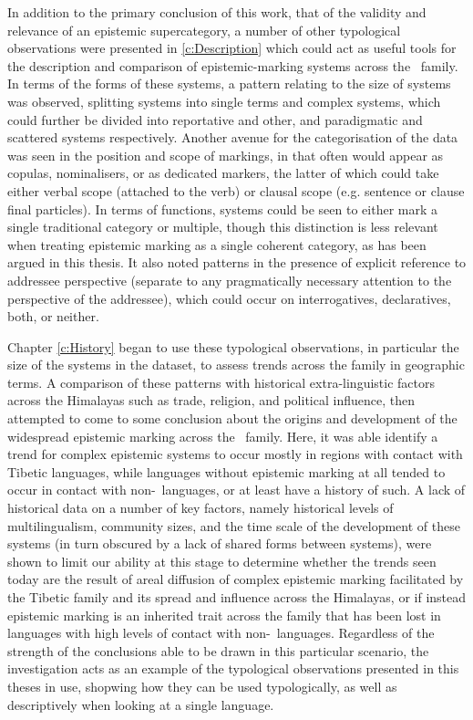 In addition to the primary conclusion of this work, that of the validity and relevance of an epistemic supercategory, a number of other typological observations were presented in \ref{c:Description} which could act as useful tools for the description and comparison of epistemic-marking systems across the \lfam\ family. In terms of the forms of these systems, a pattern relating to the size of systems was observed, splitting systems into single terms and complex systems, which could further be divided into reportative and other, and paradigmatic and scattered systems respectively. Another avenue for the categorisation of the data was seen in the position and scope of markings, in that often would appear as copulas, nominalisers, or as dedicated markers, the latter of which could take either verbal scope (attached to the verb) or clausal scope (e.g. sentence or clause final particles). In terms of functions, systems could be seen to either mark a single traditional category or multiple, though this distinction is less relevant when treating epistemic marking as a single coherent category, as has been argued in this thesis. It also noted patterns in the presence of explicit reference to addressee perspective (separate to any pragmatically necessary attention to the perspective of the addressee), which could occur on interrogatives, declaratives, both, or neither. 

Chapter \ref{c:History} began to use these typological observations, in particular the size of the systems in the dataset, to assess trends across the family in geographic terms. A comparison of these patterns with historical extra-linguistic factors across the Himalayas such as trade, religion, and political influence, then attempted to come to some conclusion about the origins and development of the widespread epistemic marking across the \lfam\ family. Here, it was able identify a trend for complex epistemic systems to occur mostly in regions with contact with Tibetic languages, while languages without epistemic marking at all tended to occur in contact with non-\lfam\ languages, or at least have a history of such. A lack of historical data on a number of key factors, namely historical levels of multilingualism, community sizes, and the time scale of the development of these systems (in turn obscured by a lack of shared forms between systems), were shown to limit our ability at this stage to determine whether the trends seen today are the result of areal diffusion of complex epistemic marking facilitated by the Tibetic family and its spread and influence across the Himalayas, or if instead epistemic marking is an inherited trait across the family that has been lost in languages with high levels of contact with non-\lfam\ languages. Regardless of the strength of the conclusions able to be drawn in this particular scenario, the investigation acts as an example of the typological observations presented in this theses in use, shopwing how they can be used typologically, as well as descriptively when looking at a single language.



